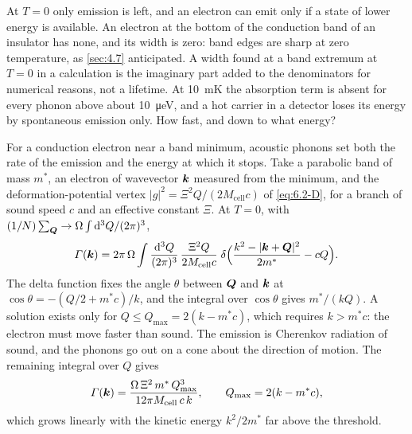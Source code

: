 At $T = 0$ only emission is left, and an electron can emit only if a state of lower energy is available. An electron at the bottom of the conduction band of an insulator has none, and its width is zero: band edges are sharp at zero temperature, as \cref{sec:4.7} anticipated. A width found at a band extremum at $T = 0$ in a calculation is the imaginary part added to the denominators for numerical reasons, not a lifetime. At \SI{10}{mK} the absorption term is absent for every phonon above about \SI{10}{\micro eV}, and a hot carrier in a detector loses its energy by spontaneous emission only. How fast, and down to what energy?

For a conduction electron near a band minimum, acoustic phonons set both the rate of the emission and the energy at which it stops. Take a parabolic band of mass $m^*$, an electron of wavevector $\bm{k}$ measured from the minimum, and the deformation-potential vertex $|g|^2 = \Xi^2Q/(2M_{\mathrm{cell}}c)$ of \cref{eq:6.2-D}, for a branch of sound speed $c$ and an effective constant $\Xi$. At $T = 0$, with $(1/N)\sum_{\bm{Q}} \to \Omega\int\mathrm{d}^3Q/(2\pi)^3$,
\begin{equation*}
  \varGamma(\bm{k}) = 2\pi\,\Omega\int\frac{\mathrm{d}^3Q}{(2\pi)^3}\,\frac{\Xi^2Q}{2M_{\mathrm{cell}}c}\;\delta\Bigl(\frac{k^2 - |\bm{k} + \bm{Q}|^2}{2m^*} - cQ\Bigr) .
\end{equation*}
The delta function fixes the angle $\theta$ between $\bm{Q}$ and $\bm{k}$ at $\cos\theta = -(Q/2 + m^*c)/k$, and the integral over $\cos\theta$ gives $m^*/(kQ)$. A solution exists only for $Q \le Q_{\max} = 2(k - m^*c)$, which requires $k > m^*c$: the electron must move faster than sound. The emission is Cherenkov radiation of sound, and the phonons go out on a cone about the direction of motion. The remaining integral over $Q$ gives
\begin{equation}
  \varGamma(\bm{k}) = \frac{\Omega\,\Xi^2\,m^*\,Q_{\max}^3}{12\pi M_{\mathrm{cell}}\,c\,k} , \qquad Q_{\max} = 2(k - m^*c) ,
  \label{eq:6.3-cherenkov}
\end{equation}
which grows linearly with the kinetic energy $k^2/2m^*$ far above the threshold.

